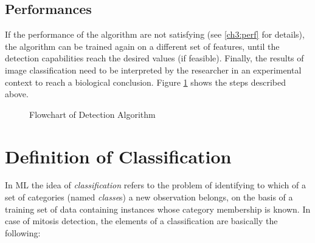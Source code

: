 \subsection{Performances}

If the performance of the algorithm are not satisfying (see \ref{ch3:perf} for details), the algorithm can be trained again on a different set of features, until the
detection capabilities reach the desired values (if feasible).
Finally, the results of image classification
need to be interpreted by the researcher in
an experimental context to reach a biological conclusion. 
Figure \ref{ch3:fig1} shows the steps described above.

\clearpage


\begin{figure}[!hbt]
\centering



\caption{Flowchart of Detection Algorithm}
\label{ch3:fig1}
\end{figure}



\section{Definition of Classification}
\label{ch3:class}

In \Gls{ML} the idea of \textit{classification} refers to the problem of identifying to which of a set of categories
(named \textit{classe}s) a new observation belongs, on the basis of a training set of data containing instances whose category membership is known.
In case of mitosis detection, the elements of a classification are basically the following:

